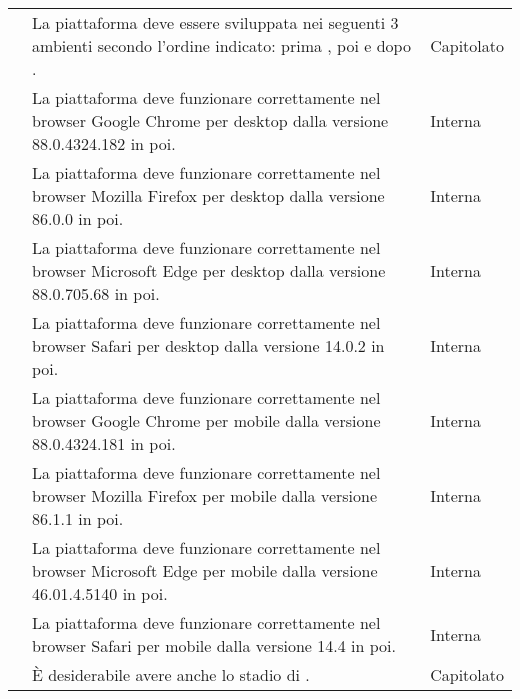 \begin{longtable}{|c C{9.5cm} C{2.5cm}|}
	 & La piattaforma deve essere sviluppata nei seguenti 3 ambienti secondo l'ordine indicato: prima , poi  e dopo . & Capitolato \\

	 & La piattaforma deve funzionare correttamente nel browser Google Chrome per desktop dalla versione 88.0.4324.182 in poi. & Interna \\

	 & La piattaforma deve funzionare correttamente nel browser Mozilla Firefox per desktop dalla versione 86.0.0 in poi. & Interna \\

	 & La piattaforma deve funzionare correttamente nel browser Microsoft Edge per desktop dalla versione 88.0.705.68 in poi. & Interna \\

	 & La piattaforma deve funzionare correttamente nel browser Safari per desktop dalla versione 14.0.2 in poi. & Interna \\

	 & La piattaforma deve funzionare correttamente nel browser Google Chrome per mobile dalla versione 88.0.4324.181 in poi. & Interna \\

	 & La piattaforma deve funzionare correttamente nel browser Mozilla Firefox per mobile dalla versione 86.1.1 in poi. & Interna \\

	 & La piattaforma deve funzionare correttamente nel browser Microsoft Edge per mobile dalla versione 46.01.4.5140 in poi. & Interna \\

	 & La piattaforma deve funzionare correttamente nel browser Safari per mobile dalla versione 14.4 in poi. & Interna \\
	
	 & È desiderabile avere anche lo stadio di . & Capitolato \\
\end{longtable}
